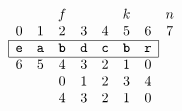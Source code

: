 \documentclass[10pt]{article}
\newcommand\erlcode[1]{\texttt{#1}}
\begin{document}
\thispagestyle{empty}
\[
\begin{array}{cccccccc}
  &   & f & & & k & & n\\
0 & 1 & 2 & 3 & 4 & 5 & 6 & 7\\
\cline{1-7}
\multicolumn{1}{|c}{\erlcode{e}} & \erlcode{a} & \textbf{\erlcode{b}} &
\erlcode{d} & \erlcode{c} & \textbf{\erlcode{b}} &
\multicolumn{1}{c|}{\erlcode{r}}\\
\cline{1-7}
6 & 5 & 4 & 3 & 2 & 1 & 0\\
  &   & 0 & 1 & 2 & 3 & 4\\
  &   & 4 & 3 & 2 & 1 & 0
\end{array}
\]
\end{document}
